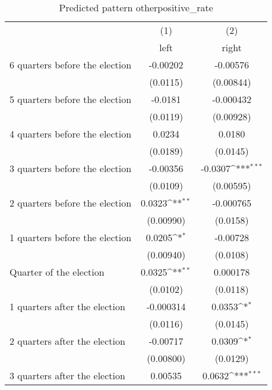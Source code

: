 \begin{table}[htbp]\centering
\def\sym#1{\ifmmode^{#1}\else\(^{#1}\)\fi}
\caption{Predicted pattern otherpositive\_rate}
\begin{tabular}{l*{2}{c}}
\hline\hline
                    &\multicolumn{1}{c}{(1)}&\multicolumn{1}{c}{(2)}\\
                    &\multicolumn{1}{c}{left}&\multicolumn{1}{c}{right}\\
\hline
 6 quarters before the election&    -0.00202         &    -0.00576         \\
                    &    (0.0115)         &   (0.00844)         \\
[1em]
 5 quarters before the election&     -0.0181         &   -0.000432         \\
                    &    (0.0119)         &   (0.00928)         \\
[1em]
 4 quarters before the election&      0.0234         &      0.0180         \\
                    &    (0.0189)         &    (0.0145)         \\
[1em]
 3 quarters before the election&    -0.00356         &     -0.0307\sym{***}\\
                    &    (0.0109)         &   (0.00595)         \\
[1em]
 2 quarters before the election&      0.0323\sym{**} &   -0.000765         \\
                    &   (0.00990)         &    (0.0158)         \\
[1em]
 1 quarters before the election&      0.0205\sym{*}  &    -0.00728         \\
                    &   (0.00940)         &    (0.0108)         \\
[1em]
Quarter of the election&      0.0325\sym{**} &    0.000178         \\
                    &    (0.0102)         &    (0.0118)         \\
[1em]
 1 quarters after the election&   -0.000314         &      0.0353\sym{*}  \\
                    &    (0.0116)         &    (0.0145)         \\
[1em]
 2 quarters after the election&    -0.00717         &      0.0309\sym{*}  \\
                    &   (0.00800)         &    (0.0129)         \\
[1em]
 3 quarters after the election&     0.00535         &      0.0632\sym{***}\\

\end{tabular}
\end{table}
